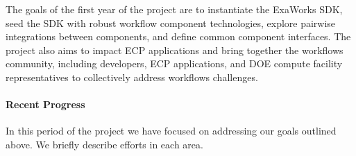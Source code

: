 The goals of the first year of the project are to instantiate the ExaWorks SDK, seed the SDK with
robust workflow component technologies, explore pairwise integrations between components, and define
common component interfaces.  The project also aims to impact ECP applications and
bring together the workflows community, including developers, ECP applications, and DOE compute facility representatives
to collectively address workflows challenges.

\paragraph{Recent Progress}



In this period of the project we have focused on addressing our goals outlined above. 
We briefly describe efforts in each area. 


